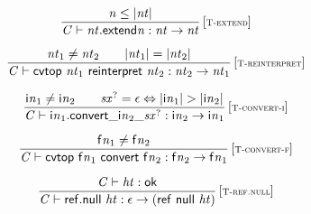 \vspace{1ex}

$$
\begin{array}{@{}c@{}}\displaystyle
\frac{
{\mathit{n}} \leq {|{\mathit{nt}}|}
}{
{\mathit{C}} \vdash {{\mathit{nt}}.\mathsf{extend}}{{\mathit{n}}} : {\mathit{nt}} \rightarrow {\mathit{nt}}
} \, {[\textsc{\scriptsize T{-}extend}]}
\qquad
\end{array}
$$

$$
\begin{array}{@{}c@{}}\displaystyle
\frac{
{\mathit{nt}}_{{1}} \neq {\mathit{nt}}_{{2}}
 \qquad
{|{\mathit{nt}}_{{1}}|} = {|{\mathit{nt}}_{{2}}|}
}{
{\mathit{C}} \vdash \mathsf{cvtop}~{\mathit{nt}}_{{1}}~\mathsf{reinterpret}~{\mathit{nt}}_{{2}} : {\mathit{nt}}_{{2}} \rightarrow {\mathit{nt}}_{{1}}
} \, {[\textsc{\scriptsize T{-}reinterpret}]}
\qquad
\end{array}
$$

$$
\begin{array}{@{}c@{}}\displaystyle
\frac{
{{\mathsf{i}}{{\mathit{n}}}}_{{1}} \neq {{\mathsf{i}}{{\mathit{n}}}}_{{2}}
 \qquad
{{\mathit{sx}}^?} = \epsilon \Leftrightarrow {|{{\mathsf{i}}{{\mathit{n}}}}_{{1}}|} > {|{{\mathsf{i}}{{\mathit{n}}}}_{{2}}|}
}{
{\mathit{C}} \vdash {{\mathsf{i}}{{\mathit{n}}}}_{{1}} . {{{{\mathsf{convert}}{\mathsf{\_}}}{{{\mathsf{i}}{{\mathit{n}}}}_{{2}}}}{\mathsf{\_}}}{{{\mathit{sx}}^?}} : {{\mathsf{i}}{{\mathit{n}}}}_{{2}} \rightarrow {{\mathsf{i}}{{\mathit{n}}}}_{{1}}
} \, {[\textsc{\scriptsize T{-}convert{-}i}]}
\qquad
\end{array}
$$

$$
\begin{array}{@{}c@{}}\displaystyle
\frac{
{{\mathsf{f}}{{\mathit{n}}}}_{{1}} \neq {{\mathsf{f}}{{\mathit{n}}}}_{{2}}
}{
{\mathit{C}} \vdash \mathsf{cvtop}~{{\mathsf{f}}{{\mathit{n}}}}_{{1}}~\mathsf{convert}~{{\mathsf{f}}{{\mathit{n}}}}_{{2}} : {{\mathsf{f}}{{\mathit{n}}}}_{{2}} \rightarrow {{\mathsf{f}}{{\mathit{n}}}}_{{1}}
} \, {[\textsc{\scriptsize T{-}convert{-}f}]}
\qquad
\end{array}
$$

\vspace{1ex}

$$
\begin{array}{@{}c@{}}\displaystyle
\frac{
{\mathit{C}} \vdash {\mathit{ht}} : \mathsf{ok}
}{
{\mathit{C}} \vdash \mathsf{ref.null}~{\mathit{ht}} : \epsilon \rightarrow (\mathsf{ref}~\mathsf{null}~{\mathit{ht}})
} \, {[\textsc{\scriptsize T{-}ref.null}]}
\qquad
\end{array}
$$

